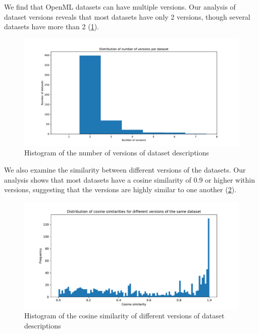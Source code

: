 We find that OpenML datasets can have multiple versions. Our analysis of dataset versions reveals that most datasets have only 2 versions, though several datasets have more than 2 (\cref{fig:number_of_versions}).

\begin{figure}[h]
    \centering
    \includegraphics[width=\textwidth]{figures/number_of_versions.pdf}
    \caption{Histogram of the number of versions of dataset descriptions}
    \label{fig:number_of_versions}
\end{figure}

We also examine the similarity between different versions of the datasets. Our analysis shows that most datasets have a cosine similarity of 0.9 or higher within versions, suggesting that the versions are highly similar to one another (\cref{fig:cosine_similarity_dataset_versions}).

\begin{figure}[h]
    \centering
    \includegraphics[width=\textwidth]{figures/cosine_similarity_dataset_versions.pdf}
    \caption{Histogram of the cosine similarity of different versions of dataset descriptions}
    \label{fig:cosine_similarity_dataset_versions}
\end{figure}

